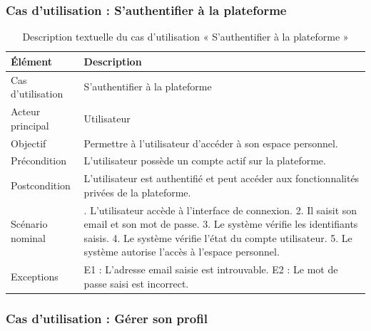 \subsubsection{Cas d’utilisation : S’authentifier à la plateforme}


\begin{table}[H]
\centering
\caption{Description textuelle du cas d’utilisation « S’authentifier à la plateforme »}
\label{tableau:3-3}
\renewcommand{\arraystretch}{1.2}
\begin{tabularx}{\textwidth}{|>{\raggedright\arraybackslash}X|>{\raggedright\arraybackslash}X|}
\hline
\rowcolor[HTML]{ECF4FF}
\textbf{Élément} & \textbf{Description} \\
\hline
Cas d’utilisation & S’authentifier à la plateforme \\
\hline
Acteur principal & Utilisateur \\
\hline
Objectif & Permettre à l’utilisateur d’accéder à son espace personnel. \\
\hline
Précondition & L’utilisateur possède un compte actif sur la plateforme. \\
\hline
Postcondition & L’utilisateur est authentifié et peut accéder aux fonctionnalités privées de la plateforme. \\
\hline
Scénario nominal & 1. L’utilisateur accède à l’interface de connexion.\newline{} 2. Il saisit son email et son mot de passe.\newline{} 3. Le système vérifie les identifiants saisis.\newline{} 4. Le système vérifie l’état du compte utilisateur.\newline{} 5. Le système autorise l’accès à l’espace personnel. \\
\hline
Exceptions & E1 : L’adresse email saisie est introuvable.\newline{} E2 : Le mot de passe saisi est incorrect. \\
\hline
\end{tabularx}
\end{table}


\subsubsection{Cas d’utilisation : Gérer son profil}


